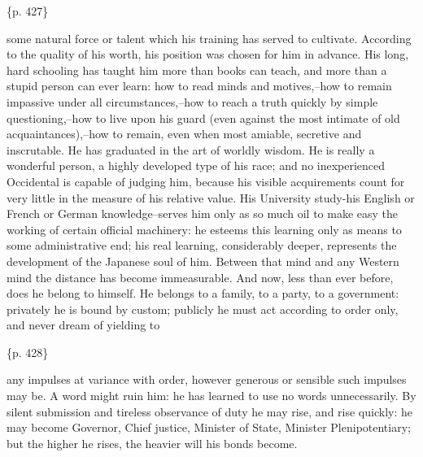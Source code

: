 \{p. 427\}

some natural force or talent which his training has served to cultivate. According to the quality of his worth, his position was chosen for him in advance. His long, hard schooling has taught him more than books can teach, and more than a stupid person can ever learn: how to read minds and motives,--how to remain impassive under all circumstances,--how to reach a truth quickly by simple questioning,--how to live upon his guard (even against the most intimate of old acquaintances),--how to remain, even when most amiable, secretive and inscrutable. He has graduated in the art of worldly wisdom. He is really a wonderful person, a highly developed type of his race; and no inexperienced Occidental is capable of judging him, because his visible acquirements count for very little in the measure of his relative value. His University study-his English or French or German knowledge--serves him only as so much oil to make easy the working of certain official machinery: he esteems this learning only as means to some administrative end; his real learning, considerably deeper, represents the development of the Japanese soul of him. Between that mind and any Western mind the distance has become immeasurable. And now, less than ever before, does he belong to himself. He belongs to a family, to a party, to a government: privately he is bound by custom; publicly he must act according to order only, and never dream of yielding to

\{p. 428\}

any impulses at variance with order, however generous or sensible such impulses may be. A word might ruin him: he has learned to use no words unnecessarily. By silent submission and tireless observance of duty he may rise, and rise quickly: he may become Governor, Chief justice, Minister of State, Minister Plenipotentiary; but the higher he rises, the heavier will his bonds become.

